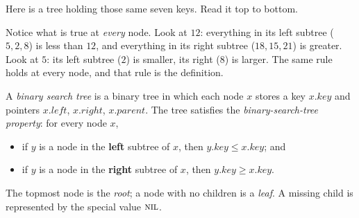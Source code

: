 Here is a tree holding those same seven keys. Read it top to bottom.

\begin{center}
\end{center}

Notice what is true at \emph{every} node. Look at $12$: everything in its left subtree
($5,2,8$) is less than $12$, and everything in its right subtree ($18,15,21$) is greater.
Look at $5$: its left subtree ($2$) is smaller, its right ($8$) is larger. The same rule
holds at every node, and that rule is the definition.

\begin{formalbox}
\begin{definition}
\label{ch12:bst-property}
A \emph{binary search tree} is a binary tree in which each node $x$ stores a key
$x.\mathit{key}$ and pointers $x.\mathit{left}$, $x.\mathit{right}$, $x.\mathit{parent}$. The tree satisfies the
\emph{binary-search-tree property}: for every node $x$,
\begin{itemize}
  \item if $y$ is a node in the \textbf{left} subtree of $x$, then $y.\mathit{key} \le x.\mathit{key}$; and
  \item if $y$ is a node in the \textbf{right} subtree of $x$, then $y.\mathit{key} \ge x.\mathit{key}$.
\end{itemize}
The topmost node is the \emph{root}; a node with no children is a \emph{leaf}. A missing
child is represented by the special value $\textsc{nil}$.
\end{definition}
\end{formalbox}


